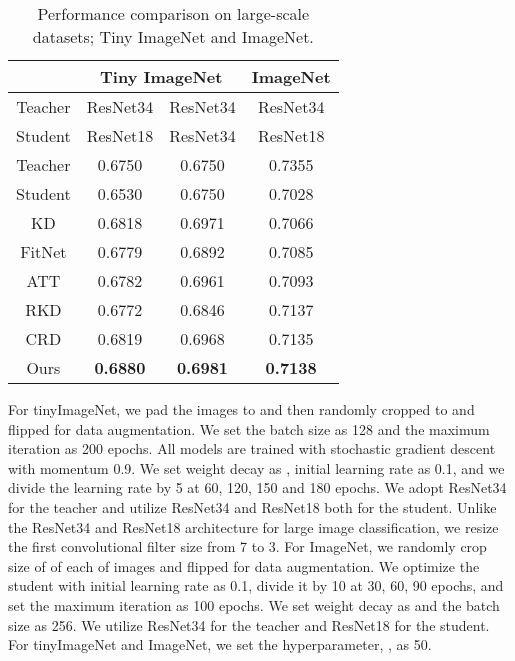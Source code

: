 \begin{table}
\centering
\begin{tabular}{c|cc|c}
\toprule
        & \multicolumn{2}{c|}{Tiny ImageNet}         & ImageNet \\ \midrule
Teacher & ResNet34        & ResNet34        & ResNet34 \\
Student & ResNet18        & ResNet34        & ResNet18 \\ \midrule
Teacher & 0.6750          & 0.6750          & 0.7355   \\
Student & 0.6530          & 0.6750          & 0.7028   \\ \midrule
KD      & 0.6818          & 0.6971          & 0.7066   \\
FitNet  & 0.6779          & 0.6892          & 0.7085   \\
ATT     & 0.6782          & 0.6961          & 0.7093   \\
RKD     & 0.6772          & 0.6846          & 0.7137   \\
CRD     & 0.6819          & 0.6968          & 0.7135   \\ \midrule
Ours    & \textbf{0.6880} & \textbf{0.6981} & \textbf{0.7138}       \\ \bottomrule 
\end{tabular}
\vspace{0.3em}
\caption{Performance comparison on large-scale datasets; Tiny ImageNet and ImageNet.}
\label{table:imagenet}
\end{table}

For tinyImageNet, we pad the images to  and then randomly cropped to  and flipped for data augmentation. We set the batch size as 128 and the maximum iteration as 200 epochs. All models are trained with stochastic gradient descent with momentum 0.9. We set weight decay as , initial learning rate as 0.1, and we divide the learning rate by 5 at 60, 120, 150 and 180 epochs. We adopt ResNet34 for the teacher and utilize ResNet34 and ResNet18 both for the student. Unlike the ResNet34 and ResNet18 architecture for large image classification, we resize the first convolutional filter size from 7 to 3. For ImageNet, we randomly crop size of  of each of images and flipped for data augmentation. We optimize the student with initial learning rate as 0.1, divide it by 10 at 30, 60, 90 epochs, and set the maximum iteration as 100 epochs. We set weight decay as  and the batch size as 256. We utilize ResNet34 for the teacher and ResNet18 for the student. For tinyImageNet and ImageNet, we set the hyperparameter, , as 50.

